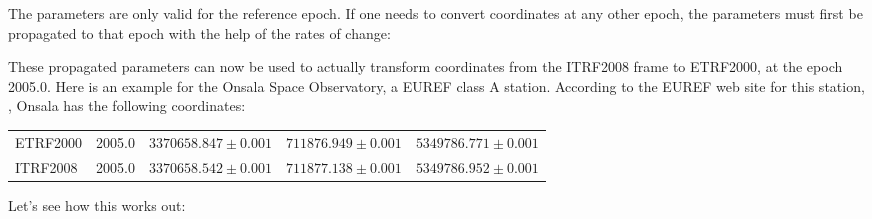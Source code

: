 \documentclass[a4paper,10pt,english]{sphinxmanual}
\begin{document}
\begin{fulllineitems}
The parameters are only valid for the reference epoch. If one
needs to convert coordinates at any other epoch, the parameters
must first be propagated to that epoch with the help of the rates
of change:

\begin{sphinxVerbatim}[commandchars=\\\{\}]
  
  
\end{sphinxVerbatim}

These propagated parameters can now be used to actually transform
coordinates from the ITRF2008 frame to ETRF2000, at the epoch
2005.0. Here is an example for the Onsala Space Observatory, a
EUREF class A station. According to the EUREF web site for this
station,
,
Onsala has the following coordinates:


\begin{savenotes}\sphinxattablestart
\centering
\begin{tabulary}{\linewidth}[t]{|T|T|T|T|T|}
\hline
{}\relax &\relax &\relax &\relax &\relax \\
\hline
ETRF2000
&
2005.0
&
\(3370658.847 \pm 0.001\)
&
\(711876.949 \pm 0.001\)
&
\(5349786.771 \pm 0.001\)
\\
\hline
ITRF2008
&
2005.0
&
\(3370658.542 \pm 0.001\)
&
\(711877.138 \pm 0.001\)
&
\(5349786.952 \pm 0.001\)
\\
\hline
\end{tabulary}
\par
\sphinxattableend\end{savenotes}

Let’s see how this works out:


\end{fulllineitems}
\end{document}

